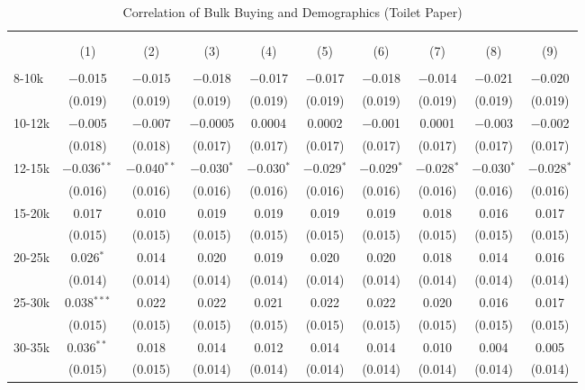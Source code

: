 
\begin{table}[!htbp] \centering 
  \caption{Correlation of Bulk Buying and Demographics (Toilet Paper)} 
  \label{tab:discountingBehavior8444} 
\begin{tabular}{@{\extracolsep{5pt}}lccccccccc} 
\\[-1.8ex]\hline 
\hline \\[-1.8ex] 
\\[-1.8ex] & (1) & (2) & (3) & (4) & (5) & (6) & (7) & (8) & (9)\\ 
\hline \\[-1.8ex] 
 8-10k & $-$0.015 & $-$0.015 & $-$0.018 & $-$0.017 & $-$0.017 & $-$0.018 & $-$0.014 & $-$0.021 & $-$0.020 \\ 
  & (0.019) & (0.019) & (0.019) & (0.019) & (0.019) & (0.019) & (0.019) & (0.019) & (0.019) \\ 
  10-12k & $-$0.005 & $-$0.007 & $-$0.0005 & 0.0004 & 0.0002 & $-$0.001 & 0.0001 & $-$0.003 & $-$0.002 \\ 
  & (0.018) & (0.018) & (0.017) & (0.017) & (0.017) & (0.017) & (0.017) & (0.017) & (0.017) \\ 
  12-15k & $-$0.036$^{**}$ & $-$0.040$^{**}$ & $-$0.030$^{*}$ & $-$0.030$^{*}$ & $-$0.029$^{*}$ & $-$0.029$^{*}$ & $-$0.028$^{*}$ & $-$0.030$^{*}$ & $-$0.028$^{*}$ \\ 
  & (0.016) & (0.016) & (0.016) & (0.016) & (0.016) & (0.016) & (0.016) & (0.016) & (0.016) \\ 
  15-20k & 0.017 & 0.010 & 0.019 & 0.019 & 0.019 & 0.019 & 0.018 & 0.016 & 0.017 \\ 
  & (0.015) & (0.015) & (0.015) & (0.015) & (0.015) & (0.015) & (0.015) & (0.015) & (0.015) \\ 
  20-25k & 0.026$^{*}$ & 0.014 & 0.020 & 0.019 & 0.020 & 0.020 & 0.018 & 0.014 & 0.016 \\ 
  & (0.014) & (0.014) & (0.014) & (0.014) & (0.014) & (0.014) & (0.014) & (0.014) & (0.014) \\ 
  25-30k & 0.038$^{***}$ & 0.022 & 0.022 & 0.021 & 0.022 & 0.022 & 0.020 & 0.016 & 0.017 \\ 
  & (0.015) & (0.015) & (0.015) & (0.015) & (0.015) & (0.015) & (0.015) & (0.015) & (0.015) \\ 
  30-35k & 0.036$^{**}$ & 0.018 & 0.014 & 0.012 & 0.014 & 0.014 & 0.010 & 0.004 & 0.005 \\ 
  & (0.015) & (0.015) & (0.014) & (0.014) & (0.014) & (0.014) & (0.014) & (0.014) & (0.014) \\ 

\end{tabular}
\end{table}
